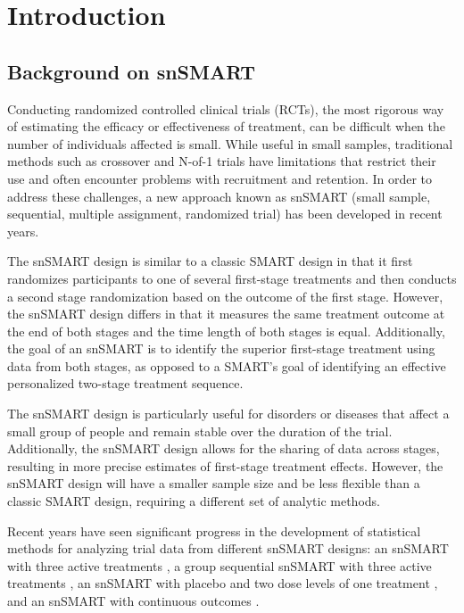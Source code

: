 \chapter{Introduction}
\label{chpt:introduction}

\section{Background on snSMART}
Conducting randomized controlled clinical trials (RCTs), the most rigorous way of
estimating the efficacy or effectiveness of treatment, can be difficult when the number of individuals affected is small. While useful in small samples, traditional methods such as crossover and N-of-1 trials have limitations that restrict their use and often encounter problems with recruitment and retention. In order to address these challenges, a new approach known as snSMART (small sample, sequential, multiple assignment, randomized trial) has been developed in recent years.

The snSMART design is similar to a classic \ac{SMART} design in that it first randomizes participants to one of several first-stage treatments and then conducts a second stage randomization based on the outcome of the first stage. However, the snSMART design differs in that it measures the same treatment outcome at the end of both stages and the time length of both stages is equal. Additionally, the goal of an snSMART is to identify the superior first-stage treatment using data from both stages, as opposed to a SMART's goal of identifying an effective personalized two-stage treatment sequence.

The snSMART design is particularly useful for disorders or diseases that affect a small group of people and remain stable over the duration of the trial. Additionally, the snSMART design allows for the sharing of data across stages, resulting in more precise estimates of first-stage treatment effects. However, the snSMART design will have a smaller sample size and be less flexible than a classic SMART design, requiring a different set of analytic methods.

Recent years have seen significant progress in the development of statistical methods for analyzing trial data from different snSMART designs: an snSMART with three active treatments \citep{wei2018bayesian, wei2020sample, chao2020dynamic}, a group sequential snSMART with three active treatments \citep{chao2020bayesian}, an snSMART with placebo and two dose levels of one treatment \citep{fang2021bayesian}, and an snSMART with continuous outcomes \citep{hartman2021design}.

